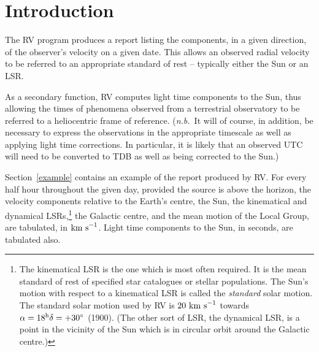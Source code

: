 \renewcommand{\thepage}{\arabic{page}}
\setcounter{page}{1}

\section{Introduction}

The RV program produces a report listing the components, in a given
direction, of the observer's velocity on a given date.  This allows an
observed radial velocity to be referred to an appropriate standard of
rest -- typically either the Sun or an LSR.

As a secondary function, RV computes light time components to the Sun,
thus allowing the times of phenomena observed from a terrestrial
observatory to be referred to a heliocentric frame of reference.  
({\it n.b.}\ It will of course, in addition, be necessary to express the
observations in the appropriate timescale as well as applying light
time corrections.  In particular, it is likely that an observed UTC
will need to be converted to TDB as well as being corrected to the
Sun.)

Section~\ref{example} contains an example of the report produced by RV.
For every half hour throughout the given day, provided the source is above the
horizon, the velocity components relative to the Earth's centre, the Sun, the
kinematical and dynamical LSRs,\footnote{The kinematical LSR is the
one which is most often required.  It is the mean standard of
rest of specified star catalogues or
stellar populations.  The Sun's motion with respect to a
kinematical LSR is called the {\it standard}\/ solar motion.
The standard solar motion used by RV is
$20~{\rm km~s}^{-1}$ towards $\alpha=18^{\rm h} \delta=+30^{\circ}$
(1900). (The other sort of LSR, the dynamical LSR, is a point in the
vicinity of the Sun which is in circular orbit around the
Galactic centre.)}
the Galactic centre, and the mean motion of the Local
Group, are tabulated, in ${\rm km~s}^{-1}$. 
Light time components to the Sun, in seconds, are tabulated also.

